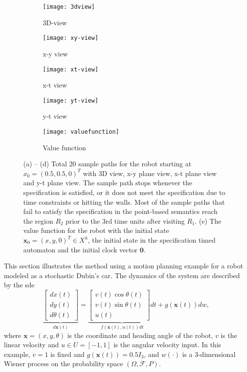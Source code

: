 \documentclass[letterpaper, 10 pt, conference]{ieeeconf}
\newcommand{\calF}{\mathcal{F}}
\begin{document}
\begin{figure*}[!t]
\centering
    \begin{subfigure}[b]{0.45\textwidth}
\centering
\texttt{[image: 3dview]}
\caption{3D-view}
\label{fig:3d-view}
\end{subfigure}
    \begin{subfigure}[b]{0.45\textwidth}
\centering
\texttt{[image: xy-view]}
\caption{x-y view}
\label{fig:xy-view}
\end{subfigure}
    \begin{subfigure}[b]{0.45\textwidth}
\centering
\texttt{[image: xt-view]}
\caption{x-t view}
\label{fig:xt-view}
\end{subfigure}
    \begin{subfigure}[b]{0.45\textwidth}
\centering
\texttt{[image: yt-view]}
\caption{y-t view}
\label{fig:yt-view}
\end{subfigure}
\vspace{-2ex}
\begin{subfigure}[b]{0.5\textwidth}
\centering
\texttt{[image: valuefunction]}
\caption{Value function}
\label{fig:valuefunction}
\end{subfigure}
\label{fig:simulation}
\caption{(a) -- (d) Total 20 sample paths for the robot starting at
  $x_0=(0.5,0.5,0)^T$ with 3D view, x-y plane view, x-t plane view and
  y-t plane view. The sample path stops whenever the specification is
  satisfied, or it does not meet the specification due to time
  constraints or hitting the walls.  Most of the sample paths that
  fail to satisfy the specification in the point-based semantics reach
  the region $R_2$ prior to the $3$rd time units after visiting
  $R_1$. (e) The value function for the robot with the initial state
  $\bm x_0=(x,y,0)^T \in X^h$, the initial state in the specification
  timed automaton and the initial clock vector $\bm 0$.}
\end{figure*}
This section illustrates the method using a motion planning example
for a robot modeled as a stochastic Dubin's car. The dynamics of the
system are described by the \ac{sde}
\[
\underbrace{\begin{bmatrix} dx(t) \\
dy (t)\\
d \theta(t)
\end{bmatrix} }_{d \bm x(t)} = \underbrace{\begin{bmatrix}
  v(t) \cos \theta(t) \\
  v(t) \sin \theta(t) \\
  u(t)
\end{bmatrix}dt}_{f( \bm x(t),u(t))dt}
+ g(\bm x(t))dw,
\] 
where $\bm x =(x,y, \theta)$ is the coordinate and heading angle of
the robot, $v$ is the linear velocity and $u \in U=[-1,1]$ is the
angular velocity input. In this example, $v=1$ is fixed and
$g(\bm x(t))=0.5 I_3$, and $w(\cdot)$ is a 3-dimensional Wiener
process on the probability space $(\Omega, \calF, P)$.
\end{document}
